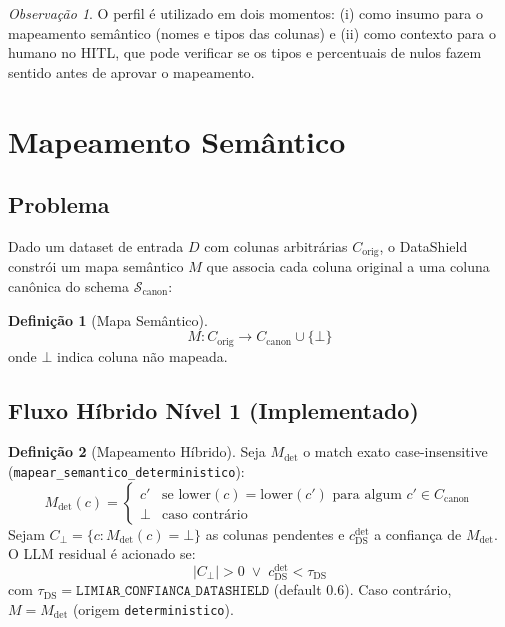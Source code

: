 \documentclass[a4paper, 12pt]{report}
\theoremstyle{definition}
\newtheorem{definicao}{Defini\c{c}\~ao}[chapter]
\theoremstyle{remark}
\newtheorem{observacao}{Observa\c{c}\~ao}[chapter]
\begin{document}
\begin{observacao}
  O perfil \'e utilizado em dois momentos: (i) como insumo para o
  mapeamento sem\^antico (nomes e tipos das colunas) e (ii) como
  contexto para o humano no HITL, que pode verificar se os tipos
  e percentuais de nulos fazem sentido antes de aprovar o mapeamento.
\end{observacao}


\section{Mapeamento Sem\^antico}

\subsection{Problema}

Dado um dataset de entrada $D$ com colunas arbitr\'arias $C_{\text{orig}}$,
o DataShield constr\'oi um mapa sem\^antico $M$ que associa cada coluna
original a uma coluna can\^onica do schema $\mathcal{S}_{\text{canon}}$:

\begin{definicao}[Mapa Sem\^antico]
  \[
    M : C_{\text{orig}} \to C_{\text{canon}} \cup \{\bot\}
  \]
  onde $\bot$ indica coluna n\~ao mapeada.
\end{definicao}

\subsection{Fluxo H\'ibrido N\'ivel 1 (Implementado)}

\begin{definicao}[Mapeamento H\'ibrido]
  Seja $M_{\text{det}}$ o match exato case-insensitive
  (\texttt{mapear\_semantico\_deterministico}):
  \[
    M_{\text{det}}(c) = \begin{cases}
      c' & \text{se } \text{lower}(c) = \text{lower}(c')
        \text{ para algum } c' \in C_{\text{canon}} \\
      \bot & \text{caso contr\'ario}
    \end{cases}
  \]
  Sejam $C_{\bot} = \{c : M_{\text{det}}(c)=\bot\}$ as colunas
  pendentes e $c_{\text{DS}}^{\text{det}}$ a confian\c{c}a de
  $M_{\text{det}}$. O LLM residual \'e acionado se:
  \[
    |C_{\bot}| > 0
    \;\lor\;
    c_{\text{DS}}^{\text{det}} < \tau_{\text{DS}}
  \]
  com $\tau_{\text{DS}} = \texttt{LIMIAR\_CONFIANCA\_DATASHIELD}$
  (default $0.6$). Caso contr\'ario, $M = M_{\text{det}}$
  (origem \texttt{deterministico}).
\end{definicao}
\end{document}
